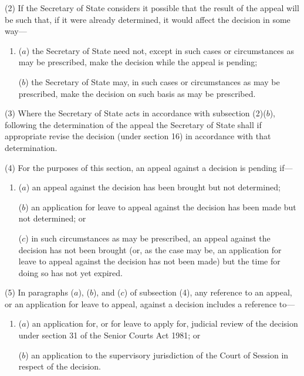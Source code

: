 \documentclass[12pt,a4paper]{article}
\begin{document}
(2) If the Secretary of State considers it possible that the result of the appeal will be such that, if it were already determined, it would affect the decision in some way---
\begin{enumerate}\item[]
($a$) the Secretary of State need not, except in such cases or circumstances as may be prescribed, make the decision while the appeal is pending;

($b$) the Secretary of State may, in such cases or circumstances as may be prescribed, make the decision on such basis as may be prescribed.
\end{enumerate}

(3) Where the Secretary of State acts in accordance with subsection (2)($b$), following the determination of the appeal the Secretary of State shall if appropriate revise the decision (under section 16) in accordance with that determination.

(4) For the purposes of this section, an appeal against a decision is pending if---
\begin{enumerate}\item[]
($a$) an appeal against the decision has been brought but not determined;

($b$) an application for leave to appeal against the decision has been made but not determined; or

($c$) in such circumstances as may be prescribed, an appeal against the decision has not been brought (or, as the case may be, an application for leave to appeal against the decision has not been made) but the time for doing so has not yet expired.
\end{enumerate}

(5) In paragraphs ($a$), ($b$), and ($c$) of subsection (4), any reference to an appeal, or an application for leave to appeal, against a decision includes a reference to---
\begin{enumerate}\item[]
($a$) an application for, or for leave to apply for, judicial review of the decision under section 31 of the Senior Courts Act 1981; or

($b$) an application to the supervisory jurisdiction of the Court of Session in respect of the decision.
\end{enumerate}
\end{document}

